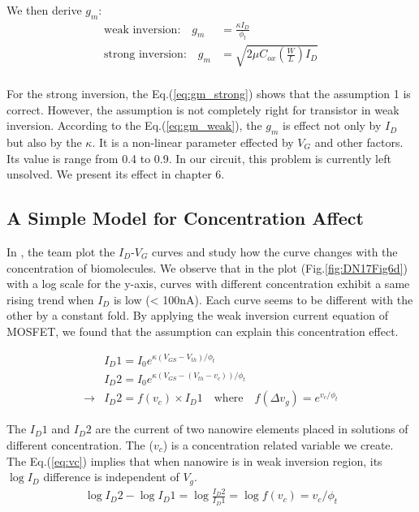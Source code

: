 We then derive $g_m$:
\begin{align}
    \text{weak inversion:} \quad g_m & = \frac{\kappa I_D}{\phi_t}\\ \label{eq:gm_weak}
    \text{strong inversion:} \quad g_m & = \sqrt{2 \mu C_{ox} (\frac{W}{L})I_{D}} \\ \label{eq:gm_strong}
\end{align}

For the strong inversion, the Eq.(\ref{eq:gm_strong}) shows that the assumption 1 is correct.
However, the assumption is not completely right for transistor in weak inversion.
According to the Eq.(\ref{eq:gm_weak}), the $g_m$ is effect not only by $I_D$ but also by the $\kappa$.
It is a non-linear parameter effected by $V_G$ and other factors.
Its value is range from 0.4 to 0.9.
In our circuit, this problem is currently left unsolved.
We present its effect in chapter 6.


\subsection{A Simple Model for Concentration Affect}
In \cite{DN17}, the team plot the $I_D$-$V_G$ curves and study how the curve changes with the concentration of biomolecules.
We observe that in the plot (Fig.\ref{fig:DN17Fig6d}) with a log scale for the y-axis, curves with different concentration exhibit a same rising trend when $I_D$ is low (< 100nA).
Each curve seems to be different with the other by a constant fold.
By applying the weak inversion current equation of MOSFET, we found that the assumption can explain this concentration effect.

\begin{align}
    & I_D1 = I_{0} e^{\kappa(V_{GS} - V_{th}) / \phi_t} \\
    & I_D2 = I_{0} e^{\kappa(V_{GS} - (V_{th} - v_c)) / \phi_t} \\
    \rightarrow & I_D2 = f(v_c) \times I_D1 \quad \text{where} \quad f(\Delta v_g) = e^{v_c / \phi_t} \label{eq:vc}
\end{align}

The $I_D1$ and $I_D2$ are the current of two nanowire elements placed in solutions of different concentration.
The ($v_c$) is a concentration related variable we create.
The Eq.(\ref{eq:vc}) implies that when nanowire is in weak inversion region, its $\log I_D$ difference is independent of $V_g$.
\begin{align}
    \log I_D2 - \log I_D1 = \log \frac{I_D2}{I_D1} = \log f(v_c) = v_c / \phi_t
\end{align}

